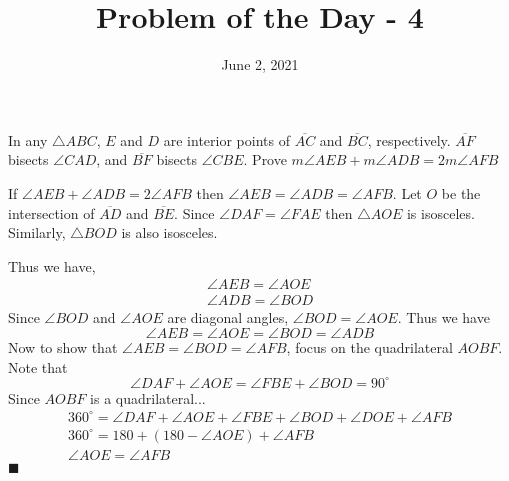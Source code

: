 \documentclass[answers]{exam}
\title{Problem of the Day - 4}
\date{June 2, 2021}
\begin{document}
	\maketitle
	\begin{questions}
		\question
		In any $\triangle ABC$, $E$ and $D$ are interior points of $\overline{AC}$ and $\overline{BC}$, respectively.
		$\overline{AF}$	bisects $\angle CAD$, and $\overline{BF}$ bisects $\angle CBE$. Prove $m\angle AEB + m\angle ADB = 2m\angle AFB$
		\begin{solution}
			If $\angle AEB + \angle ADB = 2\angle AFB$ then $\angle AEB = \angle ADB = \angle AFB$. Let $O$ be the intersection of $\overline{AD}$ and $\overline{BE}$. Since $\angle DAF = \angle FAE$ then $\triangle AOE$ is isosceles. Similarly, $\triangle BOD$ is also isosceles.
			
			Thus we have,
			\begin{gather*}
				\angle AEB = \angle AOE \\
				\angle ADB = \angle BOD
			\end{gather*}
			Since $\angle BOD$ and $\angle AOE$ are diagonal angles, $\angle BOD = \angle AOE$.
			Thus we have
			\begin{equation*}
				\angle AEB = \angle AOE = \angle BOD = \angle ADB
			\end{equation*}
			Now to show that $\angle AEB = \angle BOD = \angle AFB$, focus on the quadrilateral $AOBF$.
			Note that
			\begin{equation*}
				\angle DAF + \angle AOE = \angle FBE + \angle BOD = 90^\circ
			\end{equation*}
			Since $AOBF$ is a quadrilateral...
			\begin{gather*}
				360^\circ = \angle DAF + \angle AOE + \angle FBE + \angle BOD + \angle DOE + \angle AFB \\
				360^\circ = 180 + (180 - \angle AOE) + \angle AFB \\
				\angle AOE = \angle AFB
			\end{gather*}
			\hfill $\blacksquare$
		\end{solution}
	\end{questions}
\end{document}
